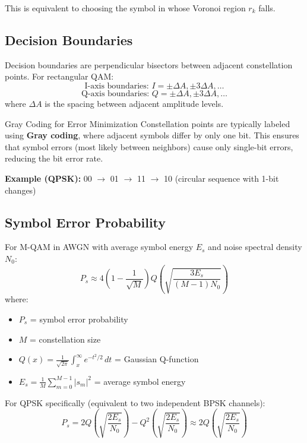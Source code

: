 This is equivalent to choosing the symbol in whose Voronoi region $r_k$ falls.

\subsection{Decision Boundaries}

Decision boundaries are perpendicular bisectors between adjacent constellation points. For rectangular QAM:
\begin{equation}
\text{I-axis boundaries: } I = \pm \Delta A, \pm 3\Delta A, \ldots
\end{equation}
\begin{equation}
\text{Q-axis boundaries: } Q = \pm \Delta A, \pm 3\Delta A, \ldots
\end{equation}
where $\Delta A$ is the spacing between adjacent amplitude levels.

\begin{calloutbox}{Gray Coding for Error Minimization}
Constellation points are typically labeled using \textbf{Gray coding}, where adjacent symbols differ by only one bit. This ensures that symbol errors (most likely between neighbors) cause only single-bit errors, reducing the bit error rate.

\textbf{Example (QPSK):} 00 $\rightarrow$ 01 $\rightarrow$ 11 $\rightarrow$ 10 (circular sequence with 1-bit changes)
\end{calloutbox}

\subsection{Symbol Error Probability}

For M-QAM in AWGN with average symbol energy $E_s$ and noise spectral density $N_0$:
\begin{equation}
P_s \approx 4\left(1 - \frac{1}{\sqrt{M}}\right) Q\left(\sqrt{\frac{3E_s}{(M-1)N_0}}\right)
\end{equation}
where:
\begin{itemize}
\item $P_s$ = symbol error probability
\item $M$ = constellation size
\item $Q(x) = \frac{1}{\sqrt{2\pi}}\int_x^\infty e^{-t^2/2}\,dt$ = Gaussian Q-function
\item $E_s = \frac{1}{M}\sum_{m=0}^{M-1}|s_m|^2$ = average symbol energy
\end{itemize}

For QPSK specifically (equivalent to two independent BPSK channels):
\begin{equation}
P_s = 2Q\left(\sqrt{\frac{2E_s}{N_0}}\right) - Q^2\left(\sqrt{\frac{2E_s}{N_0}}\right) \approx 2Q\left(\sqrt{\frac{2E_s}{N_0}}\right)
\end{equation}

